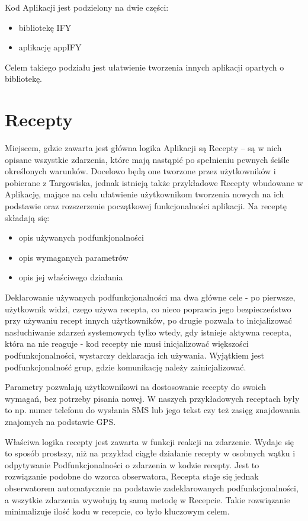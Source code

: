 \documentclass[11pt,a4paper,polish,thesis]{dcsbook}
\begin{document}
Kod Aplikacji jest podzielony na dwie części:
\begin{itemize}
\item bibliotekę IFY
\item aplikację appIFY
\end{itemize}
Celem takiego podziału jest ułatwienie tworzenia innych aplikacji opartych o bibliotekę.

\section{Recepty}
Miejscem, gdzie zawarta jest główna logika Aplikacji są Recepty -- są w nich opisane wszystkie zdarzenia, które mają nastąpić po spełnieniu pewnych ściśle określonych warunków. Docelowo będą one tworzone przez użytkowników i pobierane z Targowiska, jednak istnieją także przykładowe Recepty wbudowane w Aplikację, mające na celu ułatwienie użytkownikom tworzenia nowych na ich podstawie oraz rozszerzenie początkowej funkcjonalności aplikacji. 
Na receptę składają się:
\begin{itemize}
\item  opis używanych podfunkjonalności
\item  opis wymaganych parametrów
\item  opis jej właściwego działania
\end{itemize}
Deklarowanie używanych podfunkcjonalności ma dwa główne cele - po pierwsze, użytkownik widzi, czego używa recepta, co nieco poprawia jego bezpieczeństwo przy używaniu recept innych użytkowników, po drugie pozwala to inicjalizować nasłuchiwanie zdarzeń systemowych tylko wtedy, gdy istnieje aktywna recepta, która na nie reaguje - kod recepty nie musi inicjalizować większości podfunkcjonalności, wystarczy deklaracja ich używania. Wyjątkiem jest podfunkcjonalność grup, gdzie komunikację należy zainicjalizować.

Parametry pozwalają użytkownikowi na dostosowanie recepty do swoich wymagań, bez potrzeby pisania nowej. W naszych przykładowych receptach były to np. numer telefonu do wysłania SMS lub jego tekst czy też zasięg znajdowania znajomych na podstawie GPS.

Właściwa logika recepty jest zawarta w funkcji reakcji na zdarzenie. Wydaje się to sposób prostszy, niż na przykład ciągłe działanie recepty w osobnych wątku i odpytywanie Podfunkcjonalności o zdarzenia w kodzie recepty. Jest to rozwiązanie podobne do wzorca obserwatora, Recepta staje się jednak obserwatorem automatycznie na podstawie zadeklarowanych podfunkcjonalności, a wszytkie zdarzenia wywołują tą samą metodę w Recepcie. Takie rozwiązanie minimalizuje ilość kodu w recepcie, co było kluczowym celem.
\end{document}
